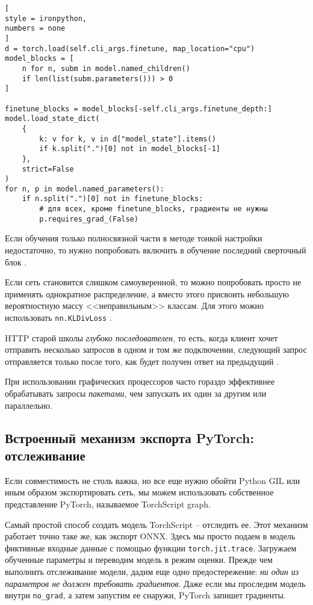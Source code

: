 \documentclass[%
	11pt,
	a4paper,
	utf8,
		]{article}
\begin{document}
\begin{lstlisting}[
style = ironpython,
numbers = none
]
d = torch.load(self.cli_args.finetune, map_location="cpu")
model_blocks = [
    n for n, subm in model.named_children()
    if len(list(subm.parameters())) > 0
]

finetune_blocks = model_blocks[-self.cli_args.finetune_depth:]
model.load_state_dict(
    {
        k: v for k, v in d["model_state"].items()
        if k.split(".")[0] not in model_blocks[-1]
    },
    strict=False
)
for n, p in model.named_parameters():
    if n.split(".")[0] not in finetune_blocks:
        # для всех, кроме finetune_blocks, градиенты не нужны
        p.requires_grad_(False)
\end{lstlisting}

Если обучения только полносвязной части в методе тонкой настройки недостаточно, то нужно попробовать включить в обучение последний сверточный блок \cite[]{pytorch-2022}.

Если сеть становится слишком самоуверенной, то можно попробовать просто не применять однократное распределение, а вместо этого присвоить небольшую вероятностную массу <<неправильным>> классам. Для этого можно использовать \verb|nn.KLDivLoss| \cite[]{pytorch-2022}.

HTTP старой школы \emph{глубоко последователен}, то есть, когда клиент хочет отправить несколько запросов в одном и том же подключении, следующий запрос отправляется только после того, как будет получен ответ на предыдущий \cite[]{pytorch-2022}.

При использовании графических процессоров часто гораздо эффективнее обрабатывать запросы \emph{пакетами}, чем запускать их один за другим или параллельно.

\subsection{Встроенный механизм экспорта PyTorch: отслеживание}

Если совместимость не столь важна, но все еще нужно обойти Python GIL или иным образом экспортировать сеть, мы можем использовать собственное представление PyTorch, называемое TorchScript graph.

Самый простой способ создать модель TorchScript -- отследить ее. Этот механизм работает точно таке же, как экспорт ONNX. Здесь мы просто подаем в модель фиктивные входные данные с помощью функции \verb|torch.jit.trace|. Загружаем обученные параметры и переводим модель в режим оценки. Прежде чем выполнить отслеживание модели, дадим еще одно предостережение: \emph{\color{blue} ни один из параметров не должен требовать градиентов}. Даже если мы проследим модель внутри \verb|no_grad|, а затем запустим ее снаружи, PyTorch запишет градиенты.
\end{document}
